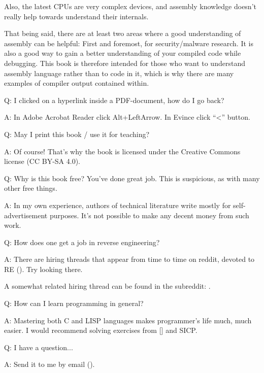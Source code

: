 Also, the latest \ac{CPU}s are very complex devices, and assembly knowledge doesn't really help towards understand their internals.

That being said, there are at least two areas where a good understanding of assembly can be helpful:
First and foremost, for security/malware research. It is also a good way to gain a better understanding of your compiled code while debugging.
This book is therefore intended for those who want to understand assembly language rather
than to code in it, which is why there are many examples of compiler output contained within.

\par Q: I clicked on a hyperlink inside a PDF-document, how do I go back?
\par A: In Adobe Acrobat Reader click Alt+LeftArrow. In Evince click ``<'' button.

\par Q: May I print this book / use it for teaching?
\par A: Of course! That's why the book is licensed under the Creative Commons license (CC BY-SA 4.0).

\par Q: Why is this book free? You've done great job. This is suspicious, as with many other free things.
\par A: In my own experience, authors of technical literature write mostly for self-advertisement purposes. It's not possible to make any decent money from such work.

\par Q: How does one get a job in reverse engineering?
\par A: There are hiring threads that appear from time to time on reddit, devoted to RE\FNURLREDDIT{}
(\RedditHiringThread{}).
Try looking there.

A somewhat related hiring thread can be found in the  subreddit: \NetsecHiringThread{}.

\par Q: How can I learn programming in general?
\par A: Mastering both C and LISP languages makes programmer's life much, much easier.
I would recommend solving exercises from [\KRBook] and \ac{SICP}.

\par Q: I have a question...
\par A: Send it to me by email (\EMAIL).



